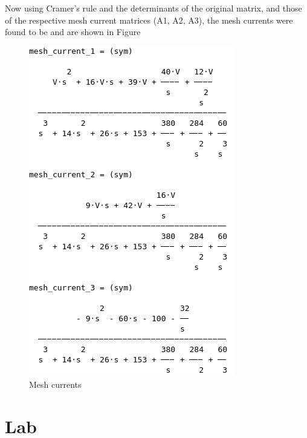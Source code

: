 \documentclass[12pt, a4paper]{article}
\begin{document}
	Now using Cramer's rule and the determinants of the original matrix, and those of the respective mesh current matrices (A1, A2, A3), the mesh currents were found to be and are shown in Figure 

	\begin{figure}[H]
		\centering
		\includegraphics[width=\textwidth]{mesh_currents}
		\caption{Mesh currents}
		\label{fig:pre_lab_question_3_a3}
	\end{figure}

	\newpage
	\section{Lab} %
\end{document}
